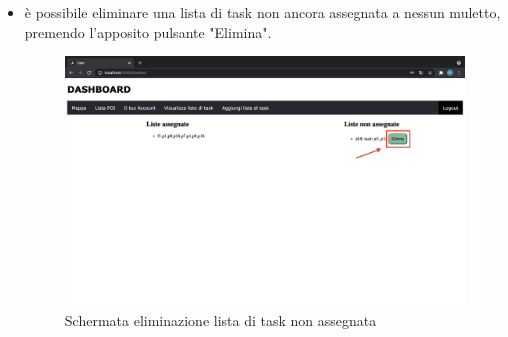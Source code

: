 \begin{itemize}
\begin{figure}[H]
    \end{figure}
    \item è possibile eliminare una lista di task non ancora assegnata a nessun muletto, premendo l'apposito pulsante "Elimina".
    \begin{figure}[H]
        \centering
        \includegraphics[scale=0.2]{res/images/deletelist.png}
        \caption{Schermata eliminazione lista di task non assegnata}
    \end{figure}
\end{itemize}    

